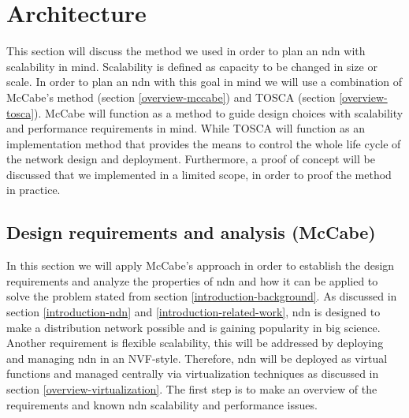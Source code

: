 \section{Architecture}



\label{planning-ndn}

This section will discuss the method we used in order to plan an \gls{ndn} with scalability in mind. Scalability is defined as capacity to be changed in size or scale. In order to plan an \gls{ndn} with this goal in mind we will use a combination of McCabe's method (section \ref{overview-mccabe}) and TOSCA (section \ref{overview-tosca}). McCabe will function as a method to guide design choices with scalability and performance requirements in mind. While TOSCA will function as an implementation method that provides the means to control the whole life cycle of the network design and deployment. Furthermore, a proof of concept will be discussed that we implemented in a limited scope, in order to proof the method in practice.


\subsection{Design requirements and analysis (McCabe)}
\label{planning-requirements}
In this section we will apply McCabe's approach in order to establish the design requirements and analyze the properties of \gls{ndn} and how it can be applied to solve the problem stated from section \ref{introduction-background}. As discussed in section \ref{introduction-ndn} and \ref{introduction-related-work}, \gls{ndn} is designed to make a distribution network possible and is gaining popularity in big science. Another requirement is flexible scalability, this will be addressed by deploying and managing \gls{ndn} in an NVF-style. Therefore, \gls{ndn} will be deployed as virtual functions and managed centrally via virtualization techniques as discussed in section \ref{overview-virtualization}. The first step is to make an overview of the requirements and known \gls{ndn} scalability and performance issues.

